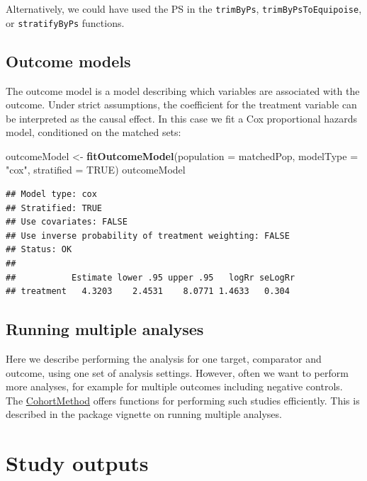 \documentclass[]{book}
\newenvironment{Shaded}{\begin{snugshade}}{\end{snugshade}}
\newcommand{\KeywordTok}[1]{\textcolor[rgb]{0.13,0.29,0.53}{\textbf{#1}}}
\newcommand{\DataTypeTok}[1]{\textcolor[rgb]{0.13,0.29,0.53}{#1}}
\newcommand{\StringTok}[1]{\textcolor[rgb]{0.31,0.60,0.02}{#1}}
\newcommand{\OtherTok}[1]{\textcolor[rgb]{0.56,0.35,0.01}{#1}}
\newcommand{\NormalTok}[1]{#1}
\begin{document}
Alternatively, we could have used the PS in the \texttt{trimByPs},
\texttt{trimByPsToEquipoise}, or \texttt{stratifyByPs} functions.

\subsection{Outcome models}\label{outcome-models}

The outcome model is a model describing which variables are associated
with the outcome. Under strict assumptions, the coefficient for the
treatment variable can be interpreted as the causal effect. In this case
we fit a Cox proportional hazards model, conditioned on the matched
sets:

\begin{Shaded}
\begin{Highlighting}[]
\NormalTok{outcomeModel <-}\StringTok{ }\KeywordTok{fitOutcomeModel}\NormalTok{(}\DataTypeTok{population =}\NormalTok{ matchedPop,}
                                \DataTypeTok{modelType =} \StringTok{"cox"}\NormalTok{,}
                                \DataTypeTok{stratified =} \OtherTok{TRUE}\NormalTok{)}
\NormalTok{outcomeModel}
\end{Highlighting}
\end{Shaded}

\begin{verbatim}
## Model type: cox
## Stratified: TRUE
## Use covariates: FALSE
## Use inverse probability of treatment weighting: FALSE
## Status: OK
## 
##           Estimate lower .95 upper .95   logRr seLogRr
## treatment   4.3203    2.4531    8.0771 1.4633   0.304
\end{verbatim}

\subsection{Running multiple analyses}\label{running-multiple-analyses}

Here we describe performing the analysis for one target, comparator and
outcome, using one set of analysis settings. However, often we want to
perform more analyses, for example for multiple outcomes including
negative controls. The
\href{https://ohdsi.github.io/CohortMethod/}{CohortMethod} offers
functions for performing such studies efficiently. This is described in
the package vignette on running multiple analyses.

\section{Study outputs}\label{studyOutputs}
\end{document}

